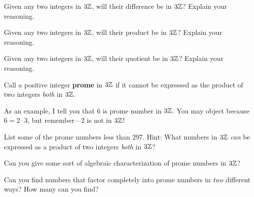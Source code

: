 \begin{prob}
Given any two integers in $3\mathbb Z$, will their difference be in $3\mathbb Z$?
Explain your reasoning.
\end{prob}

\begin{prob}
Given any two integers in $3\mathbb Z$, will their product be in $3\mathbb Z$?
Explain your reasoning.
\end{prob}

\begin{prob}
Given any two integers in $3\mathbb Z$, will their quotient be in $3\mathbb Z$?
Explain your reasoning.
\end{prob}

\begin{definition}
Call a positive integer \textbf{prome} in $3\mathbb Z$ if it cannot be
expressed as the product of two integers \textit{both} in $3\mathbb Z$.
\end{definition}

As an example, I tell you that $6$ is prome number in $3\mathbb Z$. You may
object because $6 = 2\cdot 3$, but remember---$2$ is not in $3\mathbb Z$!


\begin{prob}
List some of the prome numbers less than $297$.  Hint:  What numbers in $3\mathbb Z$ \emph{can} be expressed as a product of two integers \emph{both} in $3\mathbb Z$?  
\end{prob}

\begin{prob}
Can you give some sort of algebraic characterization of prome numbers
in $3\mathbb Z$? 
\end{prob}

\begin{prob}
Can you find numbers that factor completely into prome numbers in
\textit{two} different ways? How many can you find?
\end{prob}




